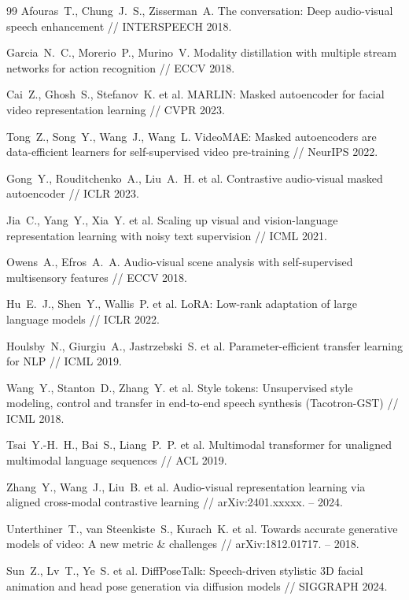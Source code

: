 \documentclass[a4paper, 12pt, oneside, openany]{article}
\begin{document}
\begin{thebibliography}{99}
Afouras~T., Chung~J.~S., Zisserman~A. The conversation: Deep audio-visual speech enhancement // INTERSPEECH 2018.

Garcia~N.~C., Morerio~P., Murino~V. Modality distillation with multiple stream networks for action recognition // ECCV 2018.

Cai~Z., Ghosh~S., Stefanov~K. et al. MARLIN: Masked autoencoder for facial video representation learning // CVPR 2023.

Tong~Z., Song~Y., Wang~J., Wang~L. VideoMAE: Masked autoencoders are data-efficient learners for self-supervised video pre-training // NeurIPS 2022.

Gong~Y., Rouditchenko~A., Liu~A.~H. et al. Contrastive audio-visual masked autoencoder // ICLR 2023.

Jia~C., Yang~Y., Xia~Y. et al. Scaling up visual and vision-language representation learning with noisy text supervision // ICML 2021.

Owens~A., Efros~A.~A. Audio-visual scene analysis with self-supervised multisensory features // ECCV 2018.

Hu~E.~J., Shen~Y., Wallis~P. et al. LoRA: Low-rank adaptation of large language models // ICLR 2022.

Houlsby~N., Giurgiu~A., Jastrzebski~S. et al. Parameter-efficient transfer learning for NLP // ICML 2019.

Wang~Y., Stanton~D., Zhang~Y. et al. Style tokens: Unsupervised style modeling, control and transfer in end-to-end speech synthesis (Tacotron-GST) // ICML 2018.

Tsai~Y.-H.~H., Bai~S., Liang~P.~P. et al. Multimodal transformer for unaligned multimodal language sequences // ACL 2019.

Zhang~Y., Wang~J., Liu~B. et al. Audio-visual representation learning via aligned cross-modal contrastive learning // arXiv:2401.xxxxx. -- 2024.

Unterthiner~T., van Steenkiste~S., Kurach~K. et al. Towards accurate generative models of video: A new metric \& challenges // arXiv:1812.01717. -- 2018.

Sun~Z., Lv~T., Ye~S. et al. DiffPoseTalk: Speech-driven stylistic 3D facial animation and head pose generation via diffusion models // SIGGRAPH 2024.


\end{thebibliography}
\end{document}
